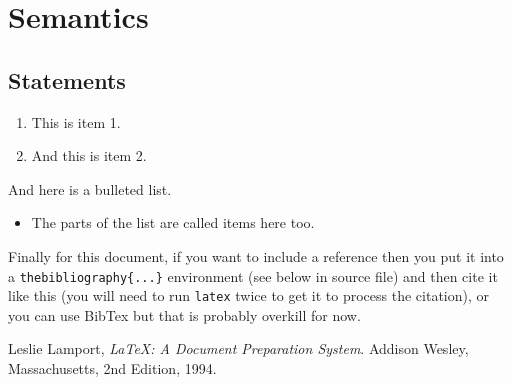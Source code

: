 \documentclass[a4wide, 11pt]{article}
\begin{document}
\section{Semantics}
\subsection{Statements}


\begin{enumerate}

    \item
    This is item 1.
    
    \item
    And this is item 2.
    
\end{enumerate}

And here is a bulleted list.

\begin{itemize}

    \item
    The parts of the list are called items here too.
    
\end{itemize}

Finally for this document, if you want to include a reference
then you put it into a \texttt{thebibliography\{...\}}
environment (see below in source file) and then 
cite it like this \cite{lamport94}
(you will need to run \texttt{latex} twice to get it to process the citation),
or you can use BibTex but that is probably overkill for now.

\begin{thebibliography}{9}

  Leslie Lamport,
  \emph{\LaTeX: A Document Preparation System}.
  Addison Wesley, Massachusetts,
  2nd Edition,
  1994.

\end{thebibliography}
\end{document}
